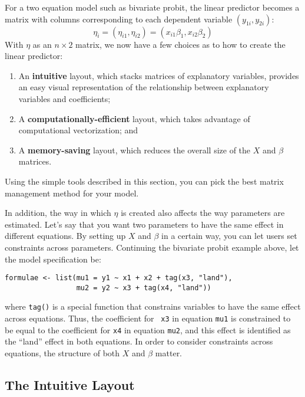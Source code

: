 For a two equation model such as bivariate probit, the linear
predictor becomes a matrix with columns corresponding to each
dependent variable $(y_{1i}, y_{2i})$:
\begin{equation*}
\eta_i = (\eta_{i1}, \eta_{i2}) = (x_{i1} \beta_1, x_{i2} \beta_2)
\end{equation*}
With $\eta$ as an $n \times 2$ matrix, we now have a few choices as to
how to create the linear predictor:
\begin{enumerate}
\item An {\bf intuitive} layout, which stacks matrices of explanatory
variables, provides an easy visual representation of the relationship
between explanatory variables and coefficients; 
\item A {\bf computationally-efficient} layout, which takes advantage
of computational vectorization; and
\item A {\bf memory-saving} layout, which reduces the overall size of the
$X$ and $\beta$ matrices.
\end{enumerate}  
Using the simple tools described in this section, you can pick the
best matrix management method for your model.  

In addition, the way in which $\eta$ is created also affects the
way parameters are estimated.  Let's say that you want two parameters
to have the same effect in different equations.  By setting up $X$ and
$\beta$ in a certain way, you can let users set constraints across
parameters.  Continuing the bivariate probit example above, let the
model specification be:
\begin{verbatim}
formulae <- list(mu1 = y1 ~ x1 + x2 + tag(x3, "land"), 
                 mu2 = y2 ~ x3 + tag(x4, "land"))
\end{verbatim}
where {\tt tag()} is a special function that constrains variables to
have the same effect across equations.  Thus, the coefficient for {\tt
x3} in equation {\tt mu1} is constrained to be equal to the
coefficient for {\tt x4} in equation {\tt mu2}, and this effect is
identified as the ``land'' effect in both equations.  In order to
consider constraints across equations, the structure of both $X$ and
$\beta$ matter.

\subsection{The Intuitive Layout}  

